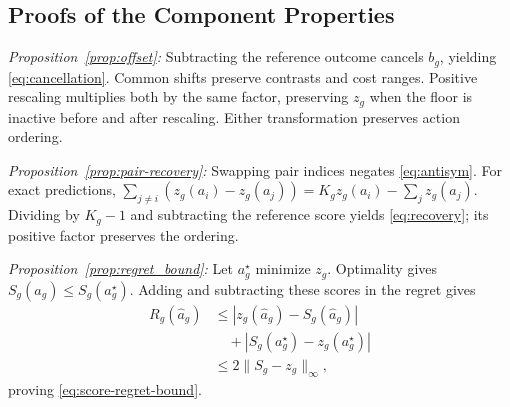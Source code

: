 \documentclass[letterpaper,journal]{IEEEtran}
\begin{document}
\subsection{Proofs of the Component Properties}
\emph{Proposition~\ref{prop:offset}:} Subtracting the reference outcome cancels $b_g$, yielding \eqref{eq:cancellation}. Common shifts preserve contrasts and cost ranges. Positive rescaling multiplies both by the same factor, preserving $z_g$ when the floor is inactive before and after rescaling. Either transformation preserves action ordering.

\emph{Proposition~\ref{prop:pair-recovery}:} Swapping pair indices negates \eqref{eq:antisym}. For exact predictions, $\sum_{j\ne i}(z_g(a_i)-z_g(a_j))=K_gz_g(a_i)-\sum_jz_g(a_j)$. Dividing by $K_g-1$ and subtracting the reference score yields \eqref{eq:recovery}; its positive factor preserves the ordering.

\emph{Proposition~\ref{prop:regret_bound}:} Let $a_g^\star$ minimize $z_g$. Optimality gives $S_g(\widehat a_g)\leq S_g(a_g^\star)$. Adding and subtracting these scores in the regret gives
\begin{align*}
 R_g(\widehat a_g)
 &\leq |z_g(\widehat a_g)-S_g(\widehat a_g)|\\
 &\quad+|S_g(a_g^\star)-z_g(a_g^\star)|\\
 &\leq2\|S_g-z_g\|_\infty,
\end{align*}
proving \eqref{eq:score-regret-bound}.
\end{document}
